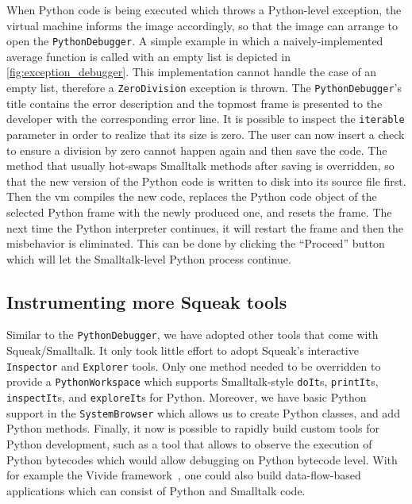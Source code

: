 \documentclass[sigconf,english]{acmart}
\newcommand{\ac}[1]{\gls*{#1}}
\newcommand*\Squeak{Squeak\slash Smalltalk\xspace}
\begin{document}
When Python code is being executed which throws a Python-level exception, the
virtual machine informs the image accordingly, so that the image can arrange to
open the \lstinline{PythonDebugger}. A simple example in which a
naively-implemented average function is called with an empty list is depicted
in \autoref{fig:exception_debugger}. This implementation cannot handle the case
of an empty list, therefore a \lstinline{ZeroDivision} exception is thrown. The
\lstinline{PythonDebugger}'s title contains the error description and the
topmost frame is presented to the developer with the corresponding error line.
It is possible to inspect the \lstinline{iterable} parameter in order to
realize that its size is zero. The user can now insert a check to ensure a
division by zero cannot happen again and then save the code. The method that
usually hot-swaps Smalltalk methods after saving is overridden, so that the new
version of the Python code is written to disk into its source file first. Then
the \ac{vm} compiles the new code, replaces the Python code object of the
selected Python frame with the newly produced one, and resets the frame. The
next time the Python interpreter continues, it will restart the frame and then
the misbehavior is eliminated. This can be done by clicking the ``Proceed''
button which will let the Smalltalk-level Python process continue.

\subsection{Instrumenting more Squeak tools}
\label{subsec:more-squeak-tools}

Similar to the \lstinline{PythonDebugger}, we have adopted other tools that
come with \Squeak. It only took little effort to adopt Squeak's interactive
\lstinline{Inspector} and \lstinline{Explorer} tools. Only one method needed to
be overridden to provide a \lstinline{PythonWorkspace} which supports
Smalltalk-style \lstinline{doIt}s, \lstinline{printIt}s,
\lstinline{inspectIt}s, and \lstinline{exploreIt}s for Python. Moreover, we
have basic Python support in the \lstinline{SystemBrowser} which allows us to
create Python classes, and add Python methods. Finally, it now is possible to
rapidly build custom tools for Python development, such as a tool that allows to
observe the execution of Python bytecodes which would allow debugging on Python
bytecode level. With for example the Vivide framework~\cite{taeumel2012vivide},
one could also build data-flow-based applications which can consist of Python
and Smalltalk code.
\end{document}
